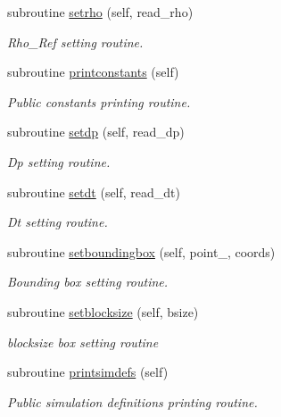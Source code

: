 \begin{DoxyCompactItemize}
subroutine \mbox{\hyperlink{namespacesimulationglobals__mod_a7d41fc05216d326ae8c0b090362430d3}{setrho}} (self, read\+\_\+rho)
\begin{DoxyCompactList}\small\item\em Rho\+\_\+\+Ref setting routine. \end{DoxyCompactList}\item 
subroutine \mbox{\hyperlink{namespacesimulationglobals__mod_a139cb36f8366e6aec875c7977235fd68}{printconstants}} (self)
\begin{DoxyCompactList}\small\item\em Public constants printing routine. \end{DoxyCompactList}\item 
subroutine \mbox{\hyperlink{namespacesimulationglobals__mod_afda1e73e6e0cd075875c70aded99d425}{setdp}} (self, read\+\_\+dp)
\begin{DoxyCompactList}\small\item\em Dp setting routine. \end{DoxyCompactList}\item 
subroutine \mbox{\hyperlink{namespacesimulationglobals__mod_a0eced3f4367d08f3d0cb6ef2044bdc56}{setdt}} (self, read\+\_\+dt)
\begin{DoxyCompactList}\small\item\em Dt setting routine. \end{DoxyCompactList}\item 
subroutine \mbox{\hyperlink{namespacesimulationglobals__mod_abf5afcc12763caab3a5fc394255ced44}{setboundingbox}} (self, point\+\_\+, coords)
\begin{DoxyCompactList}\small\item\em Bounding box setting routine. \end{DoxyCompactList}\item 
subroutine \mbox{\hyperlink{namespacesimulationglobals__mod_af0bc0b00ee3aa2ba9e47dc50daa72799}{setblocksize}} (self, bsize)
\begin{DoxyCompactList}\small\item\em blocksize box setting routine \end{DoxyCompactList}\item 
subroutine \mbox{\hyperlink{namespacesimulationglobals__mod_a54196bff569fc838730ba39a722319ff}{printsimdefs}} (self)
\begin{DoxyCompactList}\small\item\em Public simulation definitions printing routine. \end{DoxyCompactList}\item 

\end{DoxyCompactItemize}
